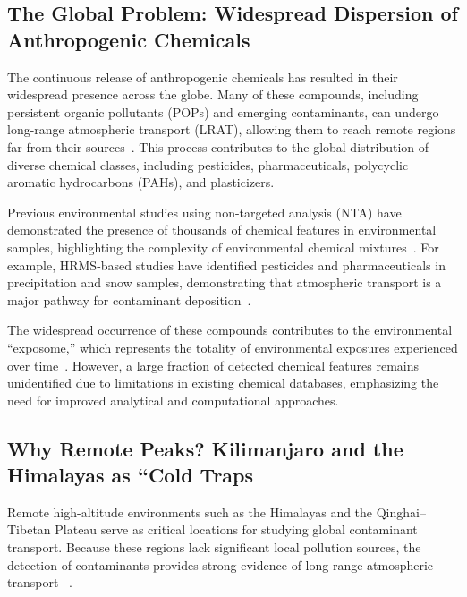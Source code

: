 \documentclass[11pt]{article}
\begin{document}
\begin{doublespace}
    \subsection{The Global Problem: Widespread Dispersion of Anthropogenic Chemicals}
    The continuous release of anthropogenic chemicals has resulted in their widespread presence across the globe.
    Many of these compounds, including persistent organic pollutants (POPs) and emerging contaminants, can undergo long-range atmospheric transport (LRAT), allowing them to reach remote regions far from their sources~\cite{Daly2005,Xu2011}.
    This process contributes to the global distribution of diverse chemical classes, including pesticides, pharmaceuticals, polycyclic aromatic hydrocarbons (PAHs), and plasticizers.

    Previous environmental studies using non-targeted analysis (NTA) have demonstrated the presence of thousands of chemical features in environmental samples, highlighting the complexity of environmental chemical mixtures~\cite{Schulze2020, Manz}.
    For example, HRMS-based studies have identified pesticides and pharmaceuticals in precipitation and snow samples, demonstrating that atmospheric transport is a major pathway for contaminant deposition~\cite{NinoSuastegui2025, Gray2022}.

    The widespread occurrence of these compounds contributes to the environmental “exposome,” which represents the totality of environmental exposures experienced over time~\cite{Manz}.
    However, a large fraction of detected chemical features remains unidentified due to limitations in existing chemical databases, emphasizing the need for improved analytical and computational approaches.

    \subsection{Why Remote Peaks? Kilimanjaro and the Himalayas as “Cold Traps}
    Remote high-altitude environments such as the Himalayas and the Qinghai–Tibetan Plateau serve as critical locations for studying global contaminant transport.
    Because these regions lack significant local pollution sources, the detection of contaminants provides strong evidence of long-range atmospheric transport ~\cite{Daly2005, Ma2025}.


\end{doublespace}
\end{document}
